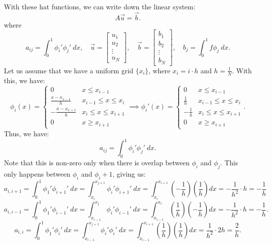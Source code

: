 \documentclass[../main/main.tex]{subfiles}
\begin{document}
   With these hat functions, we can write down the linear system: \[
       A \vec{u} = \vec{b}
   .\] where \[
       a_{ij} = \int^1_0 \phi_i' \phi_j'~dx ,\quad \vec{u} = \begin{bmatrix} u_1 \\ u_2 \\ \vdots \\ u_N \end{bmatrix} , \quad \vec{b} = \begin{bmatrix} b_1\\ b_2 \\ \vdots \\ b_N \end{bmatrix} , \quad b_j = \int^1_0 f \phi_j~dx
   .\] Let us assume that we have a uniform grid $\{x_i\} $, where $x_i = i \cdot  h$ and $h = \frac{1}{N}$. With this, we have: \[
   \phi_i(x) = \begin{cases}
       0 & x \le  x_{i-1} \\
       \frac{x-x_{x-1}}{h} & x_{i-1} \le  x \le  x_i \\
       -\frac{x-x_{x+1}}{h} & x_i \le  x \le  x_{i+1} \\
       0 & x \ge  x_{i+1}
   \end{cases} \implies \phi_i'(x) = \begin{cases}
       0 & x \le  x_{i-1} \\
      \frac{1}{h}& x_{i-1} \le  x \le  x_i \\
       -\frac{1}{h}& x_i \le  x \le  x_{i+1} \\
       0 & x \ge  x_{i+1}
   \end{cases}
   .\] Thus, we have: \[
   a_{ij} = \int^1_0 \phi_i' \phi_j'~dx
   .\] Note that this is non-zero only when there is overlap between $\phi_i$ and  $\phi_j$. This only happens between  $\phi_i$ and  $\phi_i+1$, giving us:  \[
   a_{i,i+1} = \int^1_0 \phi_1' \phi_{i+1}'~dx = \int_{x_i}^{x_{j+1}}\phi_i'\phi_{i+1}' ~dx = \int_{x_i}^{x_{i+1}}\left( -\frac{1}{h} \right)\left( \frac{1}{h} \right)dx =  -\frac{1}{h^2}\cdot h = -\frac{1}{h}
   \]\[ 
   a_{i,i-1} = \int^1_0 \phi_1' \phi_{i-1}'~dx = \int_{x_{i-1}}^{x_{j}}\phi_i'\phi_{i-1}' ~dx = \int_{x_{i-1}}^{x_{i}}\left( \frac{1}{h} \right)\left( -\frac{1}{h} \right)dx =  -\frac{1}{h^2}\cdot h = -\frac{1}{h}
   .\] 
\[ 
    a_{i,i} = \int^1_0 \phi_1' \phi_{i}'~dx = \int_{x_{i-1}}^{x_{j+1}}\phi_i'\phi_{i}' ~dx = \int_{x_{i-1}}^{x_{i+1}}\left( \frac{1}{h} \right)\left( \frac{1}{h} \right)dx =  \frac{1}{h^2}\cdot 2h = \frac{2}{h}
.\] 
\end{document}

